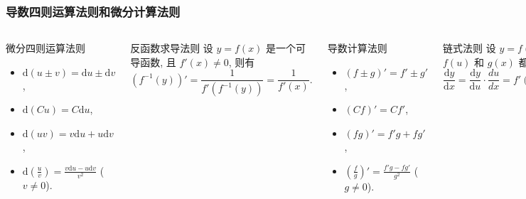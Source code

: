 \documentclass[
10pt,
aspectratio=43,
]{beamer}
\begin{document}
\begin{frame}
	\frametitle{导数四则运算法则和微分计算法则}

	\begin{columns}[t]
		\begin{exampleblock}{微分四则运算法则}
			\begin{itemize}
				\item $\mathrm{d}(u \pm v) = \mathrm{d}u \pm \mathrm{d}v$,
				\item $\mathrm{d}(Cu) = C \mathrm{d}u$,
				\item $\mathrm{d}(uv) = v \mathrm{d}u + u \mathrm{d}v$,
				\item $\displaystyle \mathrm{d}\left(\frac{u}{v}\right) = \frac{v \mathrm{d}u - u \mathrm{d}v}{v^2}$ ($v \neq 0$).
			\end{itemize}
		\end{exampleblock}
		\begin{exampleblock}{反函数求导法则}
			设 $y = f(x)$ 是一个可导函数, 且 $f'(x) \neq 0$, 则有
			\[
				\left(f^{-1}(y)\right)' = \frac{1}{f'(f^{-1}(y))}=\frac{1}{f'(x)}.
			\]
		\end{exampleblock}
		\begin{exampleblock}{导数计算法则}
			\begin{itemize}
				\item $(f \pm g)' = f' \pm g'$,
				\item $(Cf)' = Cf'$,
				\item $(fg)' = f'g + fg'$,
				\item $\displaystyle \left(\frac{f}{g}\right)' = \frac{f'g - fg'}{g^2}$ ($g \neq 0$).
			\end{itemize}
		\end{exampleblock}
		\begin{exampleblock}{链式法则}
			设 $y = f(g(x))$, 其中 $f(u)$ 和 $g(x)$ 都是可导函数, 则有
			\[
				\frac{\mathrm{d}y}{\mathrm{d}x} = \frac{\mathrm{d}y}{\mathrm{d}u} \cdot \frac{du}{dx} = f'(g(x)) \cdot g'(x).
			\]
		\end{exampleblock}

	\end{columns}

\end{frame}
\end{document}
